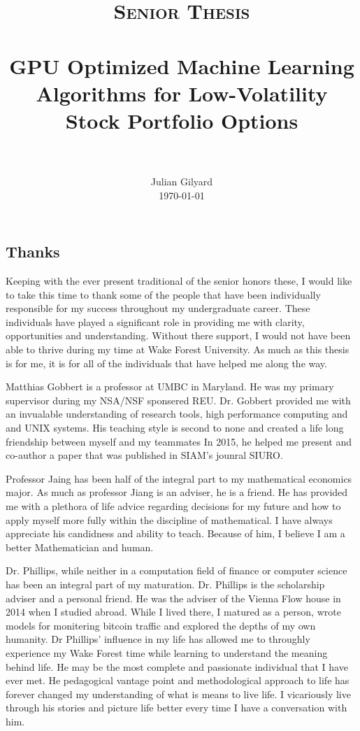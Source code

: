\documentclass[paper=letter, fontsize=11pt]{scrartcl}
\title{
		\usefont{OT1}{bch}{b}{n}
		\normalfont \normalsize \textsc{Senior Thesis} \\ [25pt]
		\horrule{0.5pt} \\[0.4cm]
		\huge GPU Optimized Machine Learning Algorithms for Low-Volatility Stock Portfolio Options \\
		\horrule{2pt} \\[0.5cm]
}
\author{
	\normalfont \normalsize
        Julian Gilyard\\[-3pt]		
	\normalsize
        \today
}
\date{}
\numberwithin{equation}{section}		%
\numberwithin{figure}{section}			%
\numberwithin{table}{section}				%
\begin{document}
\maketitle

\tableofcontents

\begin{spacing}{2}
\section{Thanks}
Keeping with the ever present traditional of the senior honors these, I would like to take this time to thank some of the people that have been individually responsible for my success throughout my undergraduate career. These individuals have played a significant role in  providing me with clarity, opportunities and understanding. Without there support, I would not have been able to thrive during my time at Wake Forest University. As much as this thesis is for me, it is for all of the individuals that have helped me along the way. 

Matthias Gobbert is a professor at UMBC in Maryland. He was my primary supervisor during my NSA/NSF sponsered REU. Dr. Gobbert provided me with an invualable understanding of research tools, high performance computing and and UNIX systems. His teaching style is second to none and created a life long friendship between myself and my teammates In 2015, he helped me present and co-author a paper that was published in SIAM's jounral SIURO. 

Professor Jaing has been half of the integral part to my mathematical economics major. As much as professor Jiang is an adviser, he is a friend. He has provided me with a plethora of life advice regarding decisions for my future and how to apply myself more fully within the discipline of mathematical. I have always appreciate his candidness and ability to teach. Because of him, I believe I am a better Mathematician and human. 

Dr. Phillips, while neither in a computation field of finance or computer science has been an integral part of my maturation. Dr. Phillips is the scholarship adviser and a personal friend. He was the adviser of the Vienna Flow house in 2014 when I studied abroad. While I lived there, I matured as a person, wrote models for monitering bitcoin traffic and explored the depths of my own humanity. Dr Phillips' influence in my life has allowed me to throughly experience my Wake Forest time while learning to understand the meaning behind life. He may be the most complete and passionate individual that I have ever met. He pedagogical vantage point and methodological approach to life has forever changed my understanding of what is means to live life. I vicariously live through his stories and picture life better every time I have a conversation with him.


\end{spacing}
\end{document}
